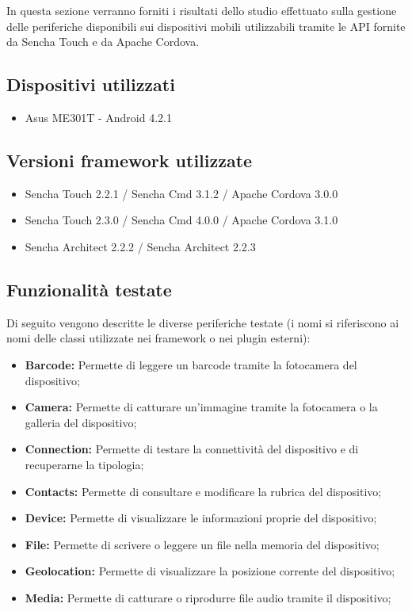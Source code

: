 In questa sezione verranno forniti i risultati dello studio effettuato sulla gestione delle periferiche disponibili sui dispositivi mobili utilizzabili tramite le API fornite da Sencha Touch e da Apache Cordova.

\subsection{Dispositivi utilizzati}
\begin{itemize}
\item Asus ME301T - Android 4.2.1
\end{itemize}

\subsection{Versioni framework utilizzate}
\begin{itemize}
\item Sencha Touch 2.2.1 / Sencha Cmd 3.1.2 / Apache Cordova 3.0.0
\item Sencha Touch 2.3.0 / Sencha Cmd 4.0.0 / Apache Cordova 3.1.0
\item Sencha Architect 2.2.2 / Sencha Architect 2.2.3
\end{itemize}


\subsection{Funzionalità testate}
Di seguito vengono descritte le diverse periferiche testate (i nomi si riferiscono ai nomi delle classi utilizzate nei framework o nei plugin esterni):
\begin{itemize}
\item \textbf{Barcode:} Permette di leggere un barcode tramite la fotocamera del dispositivo;
\item \textbf{Camera:} Permette di catturare un'immagine tramite la fotocamera o la galleria del dispositivo;
\item \textbf{Connection:} Permette di testare la connettività del dispositivo e di recuperarne la tipologia;
\item \textbf{Contacts:} Permette di consultare e modificare la rubrica del dispositivo;
\item \textbf{Device:} Permette di visualizzare le informazioni proprie del dispositivo;
\item \textbf{File:} Permette di scrivere o leggere un file nella memoria del dispositivo;
\item \textbf{Geolocation:} Permette di visualizzare la posizione corrente del dispositivo;
\item \textbf{Media:} Permette di catturare o riprodurre file audio tramite il dispositivo;
\end{itemize}


